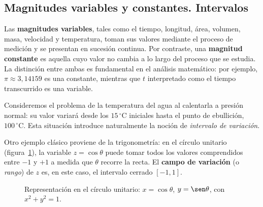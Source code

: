 \subsection{Magnitudes variables y constantes. Intervalos}

Las \textbf{magnitudes variables}, tales como el tiempo, longitud, área,
volumen, masa, velocidad y temperatura, toman sus valores mediante el proceso
de medición y se presentan en sucesión continua. Por contraste, una
\textbf{magnitud constante} es aquella cuyo valor no cambia a lo largo del
proceso que se estudia. La distinción entre ambas es fundamental en el análisis
matemático: por ejemplo, $\pi \approx 3{,}14159$ es una constante, mientras
que $t$ interpretado como el tiempo transcurrido es una variable.

Consideremos el problema de la temperatura del agua al calentarla a presión
normal: su valor variará desde los $15\,^\circ\text{C}$ iniciales hasta el
punto de ebullición, $100\,^\circ\text{C}$. Esta situación introduce
naturalmente la noción de \emph{intervalo de variación}.

Otro ejemplo clásico proviene de la trigonometría: en el círculo unitario
(figura~\ref{fig:circulo}), la variable $z = \cos\theta$ puede tomar todos los
valores comprendidos entre $-1$ y $+1$ a medida que $\theta$ recorre la recta.
El \textbf{campo de variación} (o \emph{rango}) de $z$ es, en este caso, el
intervalo cerrado $[-1,1]$.

\begin{figure}[!htbp]
\centering
{}
\caption{Representación en el círculo unitario: $x = \cos\theta$,
$y = \sen\theta$, con $x^2 + y^2 = 1$.}
\label{fig:circulo}
\end{figure}

